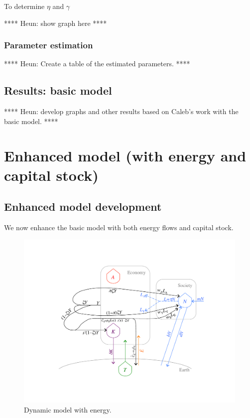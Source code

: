 \documentclass[letterpaper,12pt]{article}
\begin{document}
To determine $\eta$ and $\gamma$

**** Heun: show graph here ****

\subsubsection{Parameter estimation}
\label{sec:basic_model_parameter_estimation}

**** Heun: Create a table of the estimated parameters. ****




\subsection{Results: basic model}
\label{sec:Results_basic_model}

**** Heun: develop graphs and other results based on Caleb's work with the basic model. ****


\section{Enhanced model (with energy and capital stock)}
\label{sec:Enhanced_model}

\subsection{Enhanced model development}
\label{sec:enhanced_model_development}

We now enhance the basic model with both energy flows and capital stock.

\begin{figure} \label{fig:ModelWithEnergy}
  \begin{center}
    \includegraphics[width=\textwidth]{figure_other/ModelWithEnergy.pdf}
    \caption{Dynamic model with energy.}
  \end{center}
\end{figure}
\end{document}
